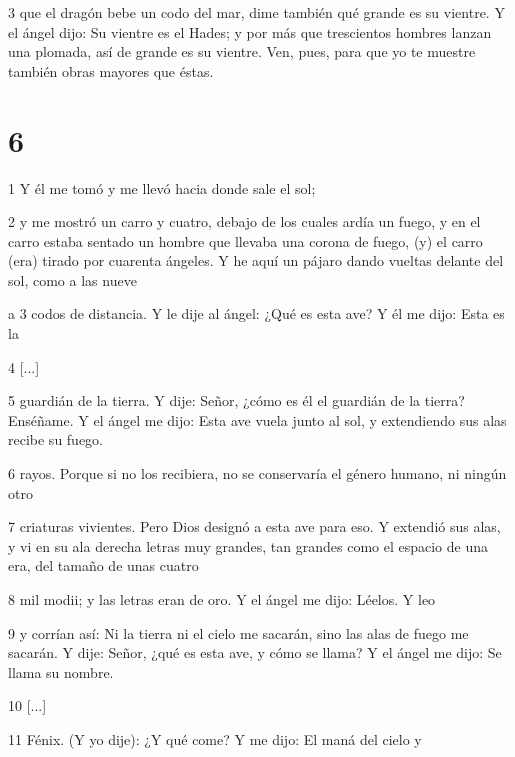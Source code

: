 \par 3 que el dragón bebe un codo del mar, dime también qué grande es su vientre. Y el ángel dijo: Su vientre es el Hades; y por más que trescientos hombres lanzan una plomada, así de grande es su vientre. Ven, pues, para que yo te muestre también obras mayores que éstas.

\chapter{6}

\par 1 Y él me tomó y me llevó hacia donde sale el sol;

\par 2 y me mostró un carro y cuatro, debajo de los cuales ardía un fuego, y en el carro estaba sentado un hombre que llevaba una corona de fuego, (y) el carro (era) tirado por cuarenta ángeles. Y he aquí un pájaro dando vueltas delante del sol, como a las nueve

\par a 3 codos de distancia. Y le dije al ángel: ¿Qué es esta ave? Y él me dijo: Esta es la

\par 4 [...]

\par 5 guardián de la tierra. Y dije: Señor, ¿cómo es él el guardián de la tierra? Enséñame. Y el ángel me dijo: Esta ave vuela junto al sol, y extendiendo sus alas recibe su fuego.

\par 6 rayos. Porque si no los recibiera, no se conservaría el género humano, ni ningún otro

\par 7 criaturas vivientes. Pero Dios designó a esta ave para eso. Y extendió sus alas, y vi en su ala derecha letras muy grandes, tan grandes como el espacio de una era, del tamaño de unas cuatro

\par 8 mil modii; y las letras eran de oro. Y el ángel me dijo: Léelos. Y leo

\par 9 y corrían así: Ni la tierra ni el cielo me sacarán, sino las alas de fuego me sacarán. Y dije: Señor, ¿qué es esta ave, y cómo se llama? Y el ángel me dijo: Se llama su nombre.

\par 10 [...]

\par 11 Fénix. (Y yo dije): ¿Y qué come? Y me dijo: El maná del cielo y

